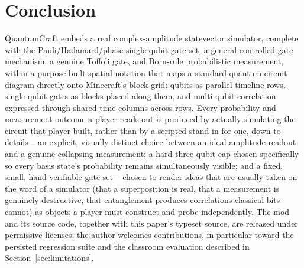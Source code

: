 \section{Conclusion}
\label{sec:conclusion}

QuantumCraft embeds a real complex-amplitude statevector simulator, complete with the
Pauli/Hadamard/phase single-qubit gate set, a general controlled-gate mechanism, a genuine
Toffoli gate, and Born-rule probabilistic measurement, within a purpose-built spatial notation
that maps a standard quantum-circuit diagram directly onto Minecraft's block grid: qubits as
parallel timeline rows, single-qubit gates as blocks placed along them, and multi-qubit
correlation expressed through shared time-columns across rows. Every probability and
measurement outcome a player reads out is produced by actually simulating the circuit that
player built, rather than by a scripted stand-in for one, down to details -- an explicit,
visually distinct choice between an ideal amplitude readout and a genuine collapsing
measurement; a hard three-qubit cap chosen specifically so every basis state's probability
remains simultaneously visible; and a fixed, small, hand-verifiable gate set -- chosen to
render ideas that are usually taken on the word of a simulator (that a superposition is real,
that a measurement is genuinely destructive, that entanglement produces correlations
classical bits cannot) as objects a player must construct and probe independently. The mod
and its source code, together with this paper's typeset source, are released under permissive
licenses; the author welcomes contributions, in particular toward the persisted regression
suite and the classroom evaluation described in Section~\ref{sec:limitations}.
